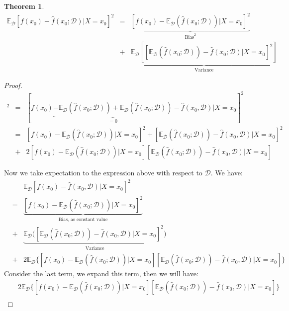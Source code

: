 \documentclass{article}
\theoremstyle{MyNonumberplain}
\theoremstyle{break}
\newtheorem*{proof}{Proof. }
\newcommand{\ev}{\mathbb{E}}
\newcommand{\evd}{\ev_{\mathcal{D}}}
\theoremstyle{break}
\newtheorem{theorem}{Theorem}[section]
\theoremstyle{break}
\theoremstyle{break}
\begin{document}
\begin{thmbox}
    \begin{theorem}
        \begin{eqnarray*}
            \evd[f(x_0)-\hat{f}(x_0;\mathcal{D})|X=x_0]^2&=&\underbrace{[f(x_0)-\evd(\hat{f}(x_0;\mathcal{D}))|X=x_0]^2}_{\text{Bias}^2}\\
            &+&\underbrace{\evd[[\evd(\hat{f}(x_0;\mathcal{D}))-\hat{f}(x_0;\mathcal{D})|X=x_0]^2]}_{\text{Variance}}
        \end{eqnarray*}
    \end{theorem}
    \begin{prfbox}
        \begin{proof}
            \begin{eqnarray*}
                [f(x_0)-\hat{f}(x_0,\mathcal{D})|X=x_0]^2 & = & [f(x_0)\underbrace{-\evd(\hat{f}(x_0;\mathcal{D}))+\evd(\hat{f}(x_0;\mathcal{D}))}_{=0}-\hat{f}(x_0,\mathcal{D})|X=x_0]^2\\
                &=& [f(x_0)-\evd(\hat{f}(x_0;\mathcal{D}))|X=x_0]^2 + [\evd(\hat{f}(x_0;\mathcal{D}))-\hat{f}(x_0,\mathcal{D})|X=x_0]^2\\
                &+& 2[f(x_0)-\evd(\hat{f}(x_0;\mathcal{D}))|X=x_0][\evd(\hat{f}(x_0;\mathcal{D}))-\hat{f}(x_0,\mathcal{D})|X=x_0]
            \end{eqnarray*}

            Now we take expectation to the expression above with respect to $\mathcal{D}$. We have:
            \begin{eqnarray*}
                &   &\evd[f(x_0)-\hat{f}(x_0,\mathcal{D})|X=x_0]^2\\
                & = & \underbrace{[f(x_0)-\evd(\hat{f}(x_0;\mathcal{D}))|X=x_0]^2}_{\text{Bias, as constant value}}\\
                & + & \underbrace{\evd\biggl([\evd(\hat{f}(x_0;\mathcal{D}))-\hat{f}(x_0,\mathcal{D})|X=x_0]^2\biggr)}_{\text{Variance}}\\
                & + & 2 \evd \biggl\{[f(x_0)-\evd(\hat{f}(x_0;\mathcal{D}))|X=x_0][\evd(\hat{f}(x_0;\mathcal{D}))-\hat{f}(x_0,\mathcal{D})|X=x_0]\biggr\}
            \end{eqnarray*}
            Consider the last term, we expand this term, then we will have: 
                \begin{eqnarray*}
                    && 2 \evd \biggl\{[f(x_0)-\evd(\hat{f}(x_0;\mathcal{D}))|X=x_0][\evd(\hat{f}(x_0;\mathcal{D}))-\hat{f}(x_0,\mathcal{D})|X=x_0]\biggr\} \\
                \end{eqnarray*}
        \end{proof}
    \end{prfbox}
\end{thmbox}
\end{document}
